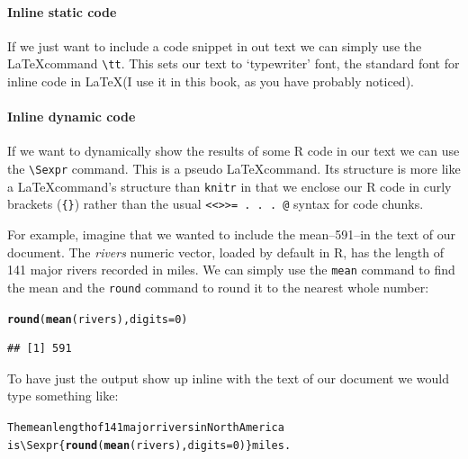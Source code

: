 \documentclass[ChapterTOCs,krantz1]{krantz}\usepackage{graphicx, color}
\makeatletter
\newcommand{\hlfunctioncall}[1]{\textcolor[rgb]{0.501960784313725,0,0.329411764705882}{\textbf{#1}}}%
\newenvironment{kframe}{%
 \def\at@end@of@kframe{}%
 \ifinner\ifhmode%
  \def\at@end@of@kframe{\end{minipage}}%
  \begin{minipage}{\columnwidth}%
 \fi\fi%
 \def\FrameCommand##1{\hskip\@totalleftmargin \hskip-\fboxsep
 \colorbox{shadecolor}{##1}\hskip-\fboxsep
     \hskip-\linewidth \hskip-\@totalleftmargin \hskip\columnwidth}%
 \MakeFramed {\advance\hsize-\width
   \@totalleftmargin\z@ \linewidth\hsize
   \@setminipage}}%
 {\par\unskip\endMakeFramed%
 \at@end@of@kframe}
\newenvironment{knitrout}{}{} %
\makeatother
\begin{document}
\paragraph{Inline static code}

If we just want to include a code snippet in out text we can simply use the \LaTeX command  \texttt{\textbackslash{}tt}. This sets our text to `typewriter' font, the standard font for inline code in \LaTeX (I use it in this book, as you have probably noticed).

\paragraph{Inline dynamic code}

If we want to dynamically show the results of some R code in our text we can use the  \texttt{\textbackslash Sexpr} command. This is a pseudo \LaTeX command. Its structure is more like a \LaTeX command's structure than \texttt{knitr} in that we enclose our R code in curly brackets (\texttt{\{\}}) rather than the usual \texttt{\textless\textless\textgreater\textgreater= . . . @} syntax for code chunks.

For example, imagine that we wanted to include the mean--591--in the text of our document. The {\emph{rivers}} numeric vector, loaded by default in R, has the length of 141 major rivers recorded in miles. We can simply use the {\tt{mean}} command to find the mean and the {\tt{round}} command to round it to the nearest whole number:

\begin{knitrout}
\color{fgcolor}\begin{kframe}
\begin{alltt}
\hlfunctioncall{round}(\hlfunctioncall{mean}(rivers), digits = 0)
\end{alltt}
\begin{verbatim}
## [1] 591
\end{verbatim}
\end{kframe}
\end{knitrout}


\noindent To have just the output show up inline with the text of our document we would type something like:

\begin{knitrout}
\color{fgcolor}\begin{kframe}
\begin{alltt}
The mean length of 141 major rivers in North America
is \textbackslash{}Sexpr\{\hlfunctioncall{round}(\hlfunctioncall{mean}(rivers), digits = 0)\} miles. 
\end{alltt}
\end{kframe}
\end{knitrout}
\end{document}
